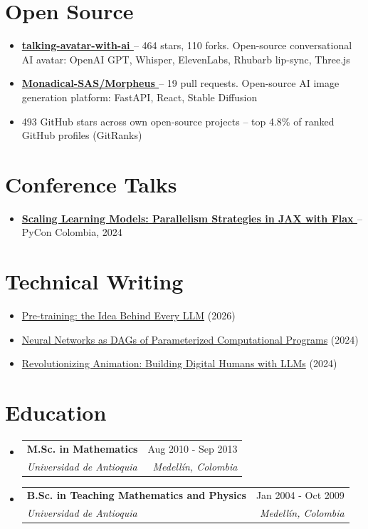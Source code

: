 \documentclass[letterpaper,10pt]{article}
\makeatletter
\newcommand{\resumeSubheading}[4]{
  \vspace{-2pt}
  \item[]
  \begin{tabular*}{\textwidth}{@{\extracolsep{\fill}}l r}
    \textbf{#1} & #2 \\
    \textit{#3} & \textit{#4} \\
  \end{tabular*}
  \vspace{-5pt}
}
\newcommand{\normalfaExternalLink}{{\mdseries\faExternalLink}}
\newcommand{\normalfaYoutube}{{\mdseries\faYoutube}}
\makeatother
\begin{document}
\section{Open Source}
\begin{itemize}[leftmargin=*, itemsep=0pt]
    \item \textbf{\href{https://github.com/asanchezyali/talking-avatar-with-ai}{talking-avatar-with-ai \normalfaExternalLink}} -- 464 stars, 110 forks. Open-source conversational AI avatar: OpenAI GPT, Whisper, ElevenLabs, Rhubarb lip-sync, Three.js
    \item \textbf{\href{https://github.com/Monadical-SAS/Morpheus}{Monadical-SAS/Morpheus \normalfaExternalLink}} -- 19 pull requests. Open-source AI image generation platform: FastAPI, React, Stable Diffusion
    \item 493 GitHub stars across own open-source projects -- top 4.8\% of ranked GitHub profiles (GitRanks)
\end{itemize}

\section{Conference Talks}
\begin{itemize}[leftmargin=*, itemsep=0pt]
    \item \textbf{\href{https://www.youtube.com/watch?v=m4hP1soE414}{Scaling Learning Models: Parallelism Strategies in JAX with Flax \normalfaYoutube}} -- PyCon Colombia, 2024
\end{itemize}

\section{Technical Writing}
\begin{itemize}[leftmargin=*, itemsep=0pt]
    \item \href{https://www.asanchezyali.com}{Pre-training: the Idea Behind Every LLM} (2026)
    \item \href{https://www.asanchezyali.com/blog/en/differentiable-programming/20240923DifferentiablePrograms}{Neural Networks as DAGs of Parameterized Computational Programs} (2024)
    \item \href{https://monadical.com/posts/build-a-digital-human-with-large-language-models.html}{Revolutionizing Animation: Building Digital Humans with LLMs} (2024)
\end{itemize}

\section{Education}
\begin{itemize}[leftmargin=0pt, itemindent=0pt, label={}]
\resumeSubheading
{M.Sc. in Mathematics}{Aug 2010 - Sep 2013}
{Universidad de Antioquia}{Medell\'in, Colombia}
\resumeSubheading
{B.Sc. in Teaching Mathematics and Physics}{Jan 2004 - Oct 2009}
{Universidad de Antioquia}{Medell\'in, Colombia}
\end{itemize}
\end{document}
